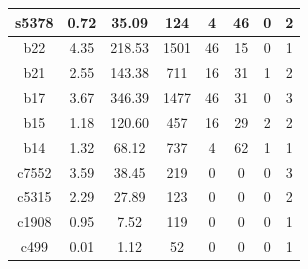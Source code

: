 \documentclass[conference]{IEEEtran}
\begin{document}
\begin{table}[H]
\begin{tabular}{|c|c|c|c|c|c|c|c|}
s5378 & 0.72 & 35.09 & 124 & 4 & 46 & 0 & 2 \\ 
\hline
b22 & 4.35 & 218.53 & 1501 & 46 & 15 & 0 & 1 \\ 
\hline
b21 & 2.55 & 143.38 & 711 & 16 & 31 & 1 & 2 \\ 
\hline
b17 & 3.67 & 346.39 & 1477 & 46 & 31 & 0 & 3 \\ 
\hline
b15 & 1.18 & 120.60 & 457 & 16 & 29 & 2 & 2 \\ 
\hline
b14 & 1.32 & 68.12 & 737 & 4 & 62 & 1 & 1 \\ 
\hline
c7552 & 3.59 & 38.45 & 219 & 0 & 0 & 0 & 3 \\ 
\hline
c5315 & 2.29 & 27.89 & 123 & 0 & 0 & 0 & 2 \\ 
\hline
c1908 & 0.95 & 7.52 & 119 & 0 & 0 & 0 & 1 \\ 
\hline
c499 & 0.01 & 1.12 & 52 & 0 & 0 & 0 & 1 \\ 
\hline
\end{tabular}
\end{table}
\end{document}
